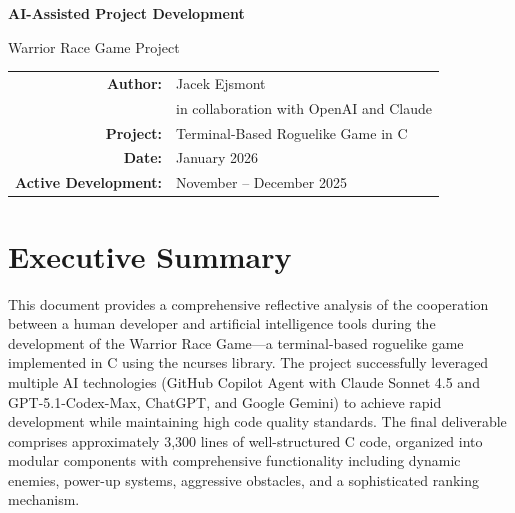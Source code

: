 \documentclass[12pt,a4paper]{article}
\begin{document}
\begin{titlepage}
    \centering
    \vspace*{4cm}
    
    {\Huge\bfseries AI-Assisted Project Development\par}
    
    \vspace{1cm}
    
    {\Large Warrior Race Game Project\par}
    
    \vspace{2cm}
    
    \begin{tabular}{rl}
        \textbf{Author:} & Jacek Ejsmont \\
        \textbf{} & in collaboration with OpenAI and Claude \\
        \textbf{Project:} & Terminal-Based Roguelike Game in C \\
        \textbf{Date:} & January 2026 \\
        \textbf{Active Development:} & November -- December 2025 \\
    \end{tabular}
    
    \vspace{1cm}
\end{titlepage}

\tableofcontents
\newpage

\section*{Executive Summary}

This document provides a comprehensive reflective analysis of the cooperation between a human developer and artificial intelligence tools during the development of the Warrior Race Game---a terminal-based roguelike game implemented in C using the ncurses library. The project successfully leveraged multiple AI technologies (GitHub Copilot Agent with Claude Sonnet 4.5 and GPT-5.1-Codex-Max, ChatGPT, and Google Gemini) to achieve rapid development while maintaining high code quality standards. The final deliverable comprises approximately 3,300 lines of well-structured C code, organized into modular components with comprehensive functionality including dynamic enemies, power-up systems, aggressive obstacles, and a sophisticated ranking mechanism.
\end{document}
